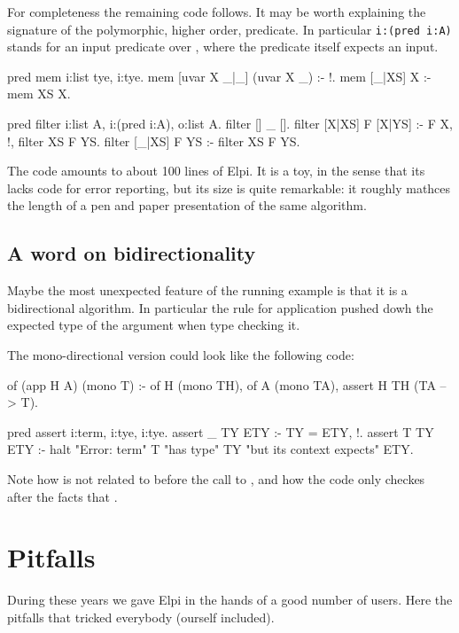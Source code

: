 \documentclass[a4paper, 11pt]{book}
\begin{document}
For completeness the remaining code follows. It may be worth explaining the
signature of the polymorphic, higher order,  predicate.
In particular \texttt{i:(pred i:A)} stands for an input predicate over
, where the predicate itself expects an input.

\begin{elpicode}
pred mem i:list tye, i:tye.
mem [uvar X _|_] (uvar X _) :- !.
mem [_|XS] X :- mem XS X.
 
pred filter i:list A, i:(pred i:A), o:list A.
filter [] _ [].
filter [X|XS] F [X|YS] :- F X, !, filter XS F YS.
filter [_|XS] F YS :- filter XS F YS.
\end{elpicode}

The code amounts to about 100 lines of Elpi. It is a toy, in the sense
that its lacks code for error reporting, but its size is quite remarkable:
it roughly mathces the length of a pen and paper presentation of the same
algorithm.

\subsection{A word on bidirectionality}

Maybe the most unexpected feature of the running example is that
it is a bidirectional algorithm. In particular the rule for application
pushed dowh the expected type of the argument when type checking it.

The mono-directional version could look like the following code:

\begin{elpicode}
of (app H A) (mono T) :-
  of H (mono TH),
  of A (mono TA),
  assert H TH (TA --> T).

pred assert i:term, i:tye, i:tye.
assert _ TY ETY :- TY = ETY, !.
assert T TY ETY :-
  halt "Error: term" T "has type" TY "but its context expects" ETY.
\end{elpicode}

Note how  is not related to  before the
call to  , and how the code only checkes
after the facts that .

\section{Pitfalls}

During these years we gave Elpi in the hands of a
good number of users. Here the pitfalls that tricked everybody (ourself included).
\end{document}

